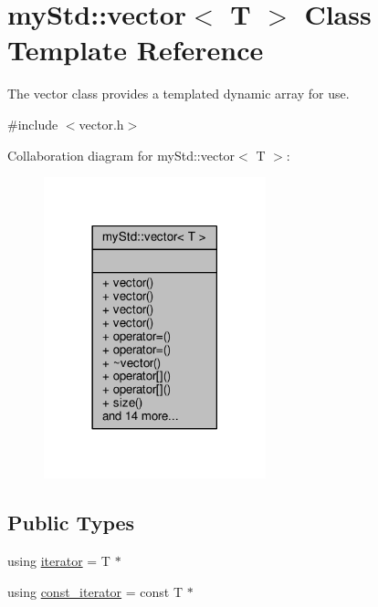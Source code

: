 \hypertarget{classmyStd_1_1vector}{}\section{my\+Std\+:\+:vector$<$ T $>$ Class Template Reference}
\label{classmyStd_1_1vector}


The vector class provides a templated dynamic array for use.  




{\ttfamily \#include $<$vector.\+h$>$}



Collaboration diagram for my\+Std\+:\+:vector$<$ T $>$\+:
\nopagebreak
\begin{figure}[H]
\begin{center}
\leavevmode
\includegraphics[width=182pt]{classmyStd_1_1vector__coll__graph}
\end{center}
\end{figure}
\subsection*{Public Types}
\begin{DoxyCompactItemize}
\item 
using \hyperlink{classmyStd_1_1vector_a667a65b093f1253d2229d06768aa3bf9}{iterator} = T $\ast$
\item 
using \hyperlink{classmyStd_1_1vector_ae8f53b1db01169b861f0299f9ced0e37}{const\+\_\+iterator} = const T $\ast$
\end{DoxyCompactItemize}
